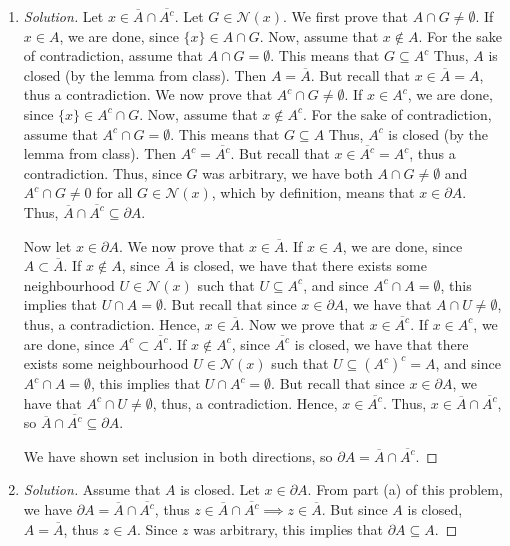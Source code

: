 \documentclass{article}
\begin{document}
\begin{enumerate}
	\item \begin{proof}[Solution]\let\qed\relax
		Let $x \in \overline{A} \cap \overline{A^c}$.
		Let $G \in \mathcal{N}(x)$.
		We first prove that $A \cap G \neq \emptyset$.
		If $x \in A$, we are done, since $\{x\} \in A \cap G$.
		Now, assume that $x \not\in A$.
		For the sake of contradiction, assume that $A \cap G = \emptyset$.
		This means that $G \subseteq A^c$
		Thus, $A$ is closed (by the lemma from class).
		Then $A = \overline{A}$.
		But recall that $x \in \overline{A} = A$, thus a contradiction.
		We now prove that $A^c \cap G \neq \emptyset$.
		If $x \in A^c$, we are done, since $\{x\} \in A^c \cap G$.
		Now, assume that $x \not\in A^c$.
		For the sake of contradiction, assume that $A^c \cap G = \emptyset$.
		This means that $G \subseteq A$
		Thus, $A^c$ is closed (by the lemma from class).
		Then $A^c = \overline{A^c}$.
		But recall that $x \in \overline{A^c} = A^c$, thus a contradiction.
		Thus, since $G$ was arbitrary, we have both
		$A \cap G \neq \emptyset$ and $A^c \cap G \neq 0$
		for all $G \in \mathcal{N}(x)$,
		which by definition, means that $x \in \partial A$.
		Thus, $\overline{A}\cap\overline{A^c} \subseteq \partial A$.

		Now let $x \in \partial A$.
		We now prove that $x \in \overline{A}$.
		If $x \in A$, we are done, since $A \subset \overline{A}$.
		If $x \not\in A$, since $\overline{A}$ is closed,
		we have that there exists some neighbourhood $U \in \mathcal{N}(x)$
		such that $U \subseteq A^c$,
		and since $A^c \cap A = \emptyset$,
		this implies that $U \cap A = \emptyset$.
		But recall that since $x \in \partial A$, we have that $A \cap U \neq \emptyset$,
		thus, a contradiction.
		Hence, $x \in \overline{A}$.
		Now we prove that $x \in \overline{A^c}$.
		If $x \in A^c$, we are done, since $A^c \subset \overline{A^c}$.
		If $x \not\in A^c$, since $\overline{A^c}$ is closed,
		we have that there exists some neighbourhood $U \in \mathcal{N}(x)$
		such that $U \subseteq (A^c)^c = A$,
		and since $A^c \cap A = \emptyset$,
		this implies that $U \cap A^c = \emptyset$.
		But recall that since $x \in \partial A$, we have that $A^c \cap U \neq \emptyset$,
		thus, a contradiction.
		Hence, $x \in \overline{A^c}$.
		Thus, $x \in \overline{A} \cap \overline{A^c}$,
		so $\overline{A} \cap \overline{A^c} \subseteq \partial A$.
		
		We have shown set inclusion in both directions,
		so $\partial A = \overline{A} \cap \overline{A^c}$.
	\end{proof}
	\item \begin{proof}[Solution]\let\qed\relax
		Assume that $A$ is closed.
		Let $x \in \partial A$.
		From part (a) of this problem,
		we have $\partial A = \overline{A} \cap \overline{A^c}$,
		thus $z \in \overline{A} \cap\overline{A^c} \implies z \in \overline{A}$.
		But since $A$ is closed, $A = \overline{A}$,
		thus $z \in A$.
		Since $z$ was arbitrary, this implies that $\partial A \subseteq A$.


\end{proof}
\end{enumerate}
\end{document}
